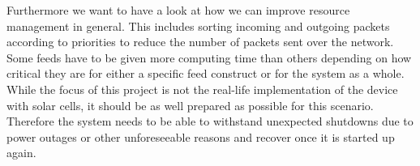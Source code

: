 Furthermore we want to have a look at how we can improve resource management in general. This includes sorting incoming and outgoing packets according to priorities to reduce the number of packets sent over the network. Some feeds have to be given more computing time than others depending on how critical they are for either a specific feed construct or for the system as a whole. \\ While the focus of this project is not the real-life implementation of the device with solar cells, it should be as well prepared as possible for this scenario. Therefore the system needs to be able to withstand unexpected shutdowns due to power outages or other unforeseeable reasons and recover once it is started up again. \\



